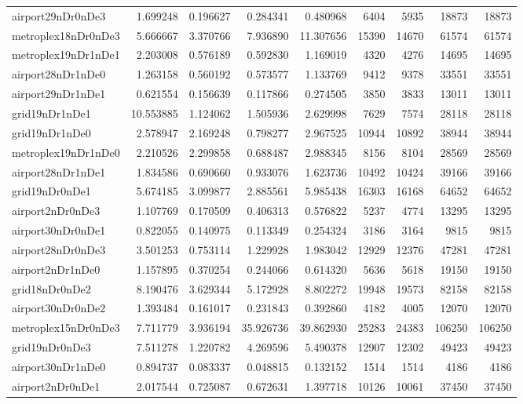 \begin{longtable}{|l|r|r|r|r|r|r|r|r|}
airport29nDr0nDe3 & 1.699248 & 0.196627 & 0.284341 & 0.480968 & 6404 & 5935 & 18873 & 18873 \\
metroplex18nDr0nDe3 & 5.666667 & 3.370766 & 7.936890 & 11.307656 & 15390 & 14670 & 61574 & 61574 \\
metroplex19nDr1nDe1 & 2.203008 & 0.576189 & 0.592830 & 1.169019 & 4320 & 4276 & 14695 & 14695 \\
airport28nDr1nDe0 & 1.263158 & 0.560192 & 0.573577 & 1.133769 & 9412 & 9378 & 33551 & 33551 \\
airport29nDr1nDe1 & 0.621554 & 0.156639 & 0.117866 & 0.274505 & 3850 & 3833 & 13011 & 13011 \\
grid19nDr1nDe1 & 10.553885 & 1.124062 & 1.505936 & 2.629998 & 7629 & 7574 & 28118 & 28118 \\
grid19nDr1nDe0 & 2.578947 & 2.169248 & 0.798277 & 2.967525 & 10944 & 10892 & 38944 & 38944 \\
metroplex19nDr1nDe0 & 2.210526 & 2.299858 & 0.688487 & 2.988345 & 8156 & 8104 & 28569 & 28569 \\
airport28nDr1nDe1 & 1.834586 & 0.690660 & 0.933076 & 1.623736 & 10492 & 10424 & 39166 & 39166 \\
grid19nDr0nDe1 & 5.674185 & 3.099877 & 2.885561 & 5.985438 & 16303 & 16168 & 64652 & 64652 \\
airport2nDr0nDe3 & 1.107769 & 0.170509 & 0.406313 & 0.576822 & 5237 & 4774 & 13295 & 13295 \\
airport30nDr0nDe1 & 0.822055 & 0.140975 & 0.113349 & 0.254324 & 3186 & 3164 & 9815 & 9815 \\
airport28nDr0nDe3 & 3.501253 & 0.753114 & 1.229928 & 1.983042 & 12929 & 12376 & 47281 & 47281 \\
airport2nDr1nDe0 & 1.157895 & 0.370254 & 0.244066 & 0.614320 & 5636 & 5618 & 19150 & 19150 \\
grid18nDr0nDe2 & 8.190476 & 3.629344 & 5.172928 & 8.802272 & 19948 & 19573 & 82158 & 82158 \\
airport30nDr0nDe2 & 1.393484 & 0.161017 & 0.231843 & 0.392860 & 4182 & 4005 & 12070 & 12070 \\
metroplex15nDr0nDe3 & 7.711779 & 3.936194 & 35.926736 & 39.862930 & 25283 & 24383 & 106250 & 106250 \\
grid19nDr0nDe3 & 7.511278 & 1.220782 & 4.269596 & 5.490378 & 12907 & 12302 & 49423 & 49423 \\
airport30nDr1nDe0 & 0.894737 & 0.083337 & 0.048815 & 0.132152 & 1514 & 1514 & 4186 & 4186 \\
airport2nDr0nDe1 & 2.017544 & 0.725087 & 0.672631 & 1.397718 & 10126 & 10061 & 37450 & 37450 \\

\end{longtable}
